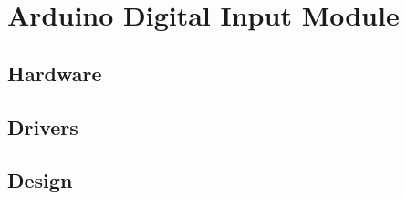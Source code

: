 

\section{Arduino Digital Input Module}

\subsection{Hardware}


\subsection{ Drivers}


\subsection {Design}






